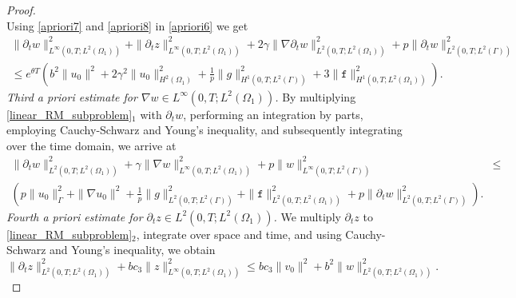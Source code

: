 \documentclass[11pt]{article}
\newcommand*{\medcap}{\mathbin{\scalebox{1.5}{\ensuremath{\cap}}}}
\begin{document}
\begin{proof}
\begin{equation}
\end{equation}
Using \eqref{apriori7} and \eqref{apriori8} in \eqref{apriori6} we get
\begin{equation}\label{apriori9}
\begin{aligned}
\parallel \partial_t w\parallel_{L^{\infty}(0,T; L^2(\Omega_1))}^2+\parallel \partial_t z\parallel_{L^{\infty}(0,T; L^2(\Omega_1))}^2+ 2\gamma\parallel \nabla \partial_t w\parallel^2_{L^{2}(0,T; L^2(\Omega_1))} + p\parallel \partial_t w\parallel^2_{L^{2}(0,T; L^2(\Gamma))} &  \\
\leq e^{\theta T} \left( b^2 \parallel u_0\parallel^2 + 2\gamma^2 \parallel  u_0\parallel_{H^2(\Omega_1)}^2 + \frac{1}{p}\parallel g\parallel^2_{H^{1}(0,T; L^2(\Gamma))} + 3\parallel \mathtt{f}\parallel^2_{H^{1}(0,T; L^2(\Omega_1))} \right).
\end{aligned}
\end{equation}
\textit{Third a priori estimate for $\nabla w\in L^{\infty}(0,T; L^2(\Omega_1))$.}
By multiplying \eqref{linear_RM_subproblem}$_{1}$ with $\partial_tw$, performing an integration by parts, employing Cauchy-Schwarz and Young's inequality, and subsequently integrating over the time domain, we arrive at
 \begin{equation}\label{apriori10}
\begin{aligned}
\parallel \partial_t w\parallel^2_{L^{2}(0,T; L^2(\Omega_1))} + \gamma\parallel \nabla w\parallel_{L^{\infty}(0,T; L^2(\Omega_1))}^2 + p\parallel w\parallel_{L^{\infty}(0,T; L^2(\Gamma))}^2 &  \leq \\
 \left(  p\parallel u_0\parallel^2_{\Gamma}+ \parallel \nabla  u_0\parallel^2 + \frac{1}{p}\parallel g\parallel^2_{L^{2}(0,T; L^2(\Gamma))} + \parallel \mathtt{f}\parallel^2_{L^{2}(0,T; L^2(\Omega_1))} + p\parallel \partial_t w\parallel^2_{L^{2}(0,T; L^2(\Gamma))}\right).
\end{aligned}
\end{equation}
\textit{Fourth a priori estimate for $\partial_tz\in L^{2}(0,T; L^2(\Omega_1))$.} We multiply $\partial_t z$ to \eqref{linear_RM_subproblem}$_{2}$, integrate over space and time, and using Cauchy-Schwarz and Young's inequality, we obtain 
\begin{equation}\label{apriori11}
\parallel \partial_t z\parallel_{L^{2}(0,T; L^2(\Omega_1))}^2 +bc_3 \parallel z\parallel_{L^{\infty}(0,T; L^2(\Omega_1))}^2 \leq bc_3\parallel v_0\parallel^2 + b^2 \parallel w\parallel_{L^{2}(0,T; L^2(\Omega_1))}^2.
\end{equation}

\end{proof}
\end{document}
